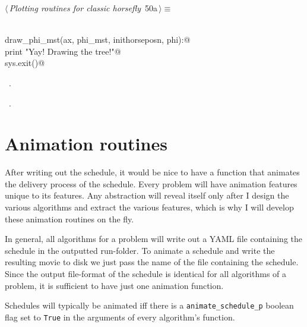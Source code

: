 \documentclass[11.5pt]{report}
\begin{document}
\begin{flushleft} \small\label{scrap62}\raggedright\small
{} $\langle\,${\itshape Plotting routines for classic horsefly}\nobreak\ {\footnotesize {50a}}$\,\rangle\equiv$
\vspace{-1ex}
\begin{list}{}{} \item
\mbox{}\verb@@\\
\mbox{}\verb@def draw_phi_mst(ax, phi_mst, inithorseposn, phi):@\\
\mbox{}\verb@     print "Yay! Drawing the tree!"@\\
\mbox{}\verb@     sys.exit()@\\
\mbox{}\verb@@{\NWsep}
\end{list}
\vspace{-1.5ex}
\footnotesize
\begin{list}{}{\setlength{\itemsep}{-\parsep}\setlength{\itemindent}{-\leftmargin}}
\item \NWtxtMacroDefBy\ .
\item \NWtxtMacroRefIn\ .

\item{}
\end{list}
\vspace{4ex}
\end{flushleft}
\section{Animation routines}

\newchunk 
After writing out the schedule, it would be nice to have a function that animates the 
delivery process of the schedule. Every problem will have animation features unique to
its features. Any abstraction will reveal itself only after I design the various
algorithms and extract the various features, which is why I will develop these animation
routines on the fly. 

In general, all algorithms for a problem will write out a YAML file containing the schedule 
in the outputted run-folder. To animate a schedule and write the resulting movie to disk
we just pass the name of the file containing the schedule. Since the output file-format
of the schedule is identical for all algorithms of a problem, it is sufficient to have
just one animation function. 

Schedules will typically be animated iff there is a \verb|animate_schedule_p| boolean 
flag set to \verb|True| in the arguments of every algorithm's function. 
\end{document}

